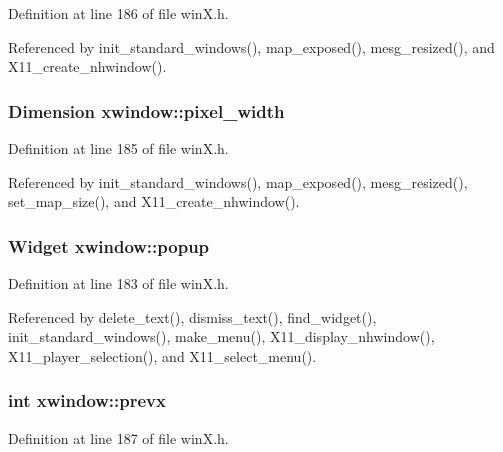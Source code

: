 Definition at line 186 of file win\+X.\+h.



Referenced by init\+\_\+standard\+\_\+windows(), map\+\_\+exposed(), mesg\+\_\+resized(), and X11\+\_\+create\+\_\+nhwindow().

\hypertarget{structxwindow_a8f270ead0a1ab2847febd35c4da5afe6}{
\subsubsection[{pixel\+\_\+width}]{\setlength{\rightskip}{0pt plus 5cm}Dimension xwindow\+::pixel\+\_\+width}}\label{structxwindow_a8f270ead0a1ab2847febd35c4da5afe6}


Definition at line 185 of file win\+X.\+h.



Referenced by init\+\_\+standard\+\_\+windows(), map\+\_\+exposed(), mesg\+\_\+resized(), set\+\_\+map\+\_\+size(), and X11\+\_\+create\+\_\+nhwindow().

\hypertarget{structxwindow_a87808ea4214ca268f6aa2df79301713e}{
\subsubsection[{popup}]{\setlength{\rightskip}{0pt plus 5cm}Widget xwindow\+::popup}}\label{structxwindow_a87808ea4214ca268f6aa2df79301713e}


Definition at line 183 of file win\+X.\+h.



Referenced by delete\+\_\+text(), dismiss\+\_\+text(), find\+\_\+widget(), init\+\_\+standard\+\_\+windows(), make\+\_\+menu(), X11\+\_\+display\+\_\+nhwindow(), X11\+\_\+player\+\_\+selection(), and X11\+\_\+select\+\_\+menu().

\hypertarget{structxwindow_ab8c3e2d2d6643622d57d1110837780fe}{
\subsubsection[{prevx}]{\setlength{\rightskip}{0pt plus 5cm}int xwindow\+::prevx}}\label{structxwindow_ab8c3e2d2d6643622d57d1110837780fe}


Definition at line 187 of file win\+X.\+h.



